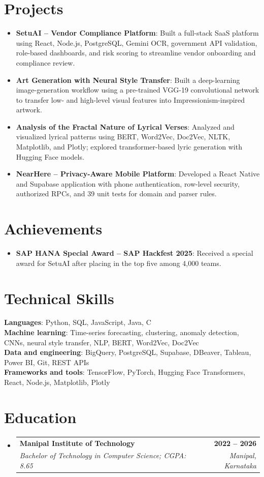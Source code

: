 \documentclass[letterpaper,11pt]{article}
\makeatletter
\newcommand{\resumeSubheading}[4]{
  \vspace{-2pt}\item
    \begin{tabular*}{1.0\textwidth}[t]{l@{\extracolsep{\fill}}r}
      \textbf{#1} & \textbf{\small #2} \\
      \textit{\small #3} & \textit{\small #4} \\
    \end{tabular*}\vspace{-8pt}
}
\newcommand{\resumePItem}[2]{
  \item[$\vcenter{\hbox{\tiny$\bullet$}}$]\small{\textbf{#1}: #2 \vspace{-2pt}}
}
\newcommand{\resumeSubItem}[2]{\resumePItem{#1}{#2}\vspace{-3pt}}
\newcommand{\resumeSubHeadingListStart}{\begin{itemize}[leftmargin=0.0in,label={}]}
\newcommand{\resumeSubHeadingListEnd}{\end{itemize}}
\makeatother
\begin{document}
\section{Projects}
\resumeSubHeadingListStart
  \resumeSubItem{SetuAI -- Vendor Compliance Platform}
    {Built a full-stack SaaS platform using React, Node.js, PostgreSQL, Gemini OCR, government API validation, role-based dashboards, and risk scoring to streamline vendor onboarding and compliance review.}
  \resumeSubItem{Art Generation with Neural Style Transfer}
    {Built a deep-learning image-generation workflow using a pre-trained VGG-19 convolutional network to transfer low- and high-level visual features into Impressionism-inspired artwork.}
  \resumeSubItem{Analysis of the Fractal Nature of Lyrical Verses}
    {Analyzed and visualized lyrical patterns using BERT, Word2Vec, Doc2Vec, NLTK, Matplotlib, and Plotly; explored transformer-based lyric generation with Hugging Face models.}
  \resumeSubItem{NearHere -- Privacy-Aware Mobile Platform}
    {Developed a React Native and Supabase application with phone authentication, row-level security, authorized RPCs, and 39 unit tests for domain and parser rules.}
\resumeSubHeadingListEnd

\section{Achievements}
\resumeSubHeadingListStart
  \resumeSubItem{SAP HANA Special Award -- SAP Hackfest 2025}
    {Received a special award for SetuAI after placing in the top five among 4,000 teams.}
\resumeSubHeadingListEnd

\section{Technical Skills}
\begin{itemize}[leftmargin=0.15in,label={}]
  \small{\item{
    \textbf{Languages}{: Python, SQL, JavaScript, Java, C} \\
    \textbf{Machine learning}{: Time-series forecasting, clustering, anomaly detection, CNNs, neural style transfer, NLP, BERT, Word2Vec, Doc2Vec} \\
    \textbf{Data and engineering}{: BigQuery, PostgreSQL, Supabase, DBeaver, Tableau, Power BI, Git, REST APIs} \\
    \textbf{Frameworks and tools}{: TensorFlow, PyTorch, Hugging Face Transformers, React, Node.js, Matplotlib, Plotly}
  }}
\end{itemize}

\section{Education}
\resumeSubHeadingListStart
  \resumeSubheading
    {Manipal Institute of Technology}{2022 -- 2026}
    {Bachelor of Technology in Computer Science; CGPA: 8.65}{Manipal, Karnataka}
\resumeSubHeadingListEnd
\end{document}
